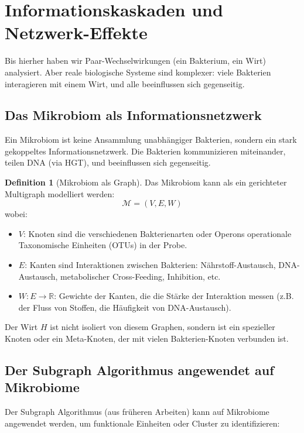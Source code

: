 \documentclass[a4paper,12pt]{article}
\theoremstyle{definition}
\newtheorem{definition}{Definition}
\begin{document}
\section{Informationskaskaden und Netzwerk-Effekte}


Bis hierher haben wir Paar-Wechselwirkungen (ein Bakterium, ein Wirt) analysiert. Aber reale biologische Systeme sind komplexer: viele Bakterien interagieren mit einem Wirt, und alle beeinflussen sich gegenseitig.

\subsection{Das Mikrobiom als Informationsnetzwerk}

Ein Mikrobiom ist keine Ansammlung unabhängiger Bakterien, sondern ein stark gekoppeltes Informationsnetzwerk. Die Bakterien kommunizieren miteinander, teilen DNA (via HGT), und beeinflussen sich gegenseitig.

\begin{definition}[Mikrobiom als Graph]
Das Mikrobiom kann als ein gerichteter Multigraph modelliert werden:
\[
\mathcal{M} = (V, E, W)
\]
wobei:
\begin{itemize}
    \item[-] $V$: Knoten sind die verschiedenen Bakterienarten oder Operons operationale Taxonomische Einheiten (OTUs) in der Probe.
    \item[-] $E$: Kanten sind Interaktionen zwischen Bakterien: Nährstoff-Austausch, DNA-Austausch, metabolischer Cross-Feeding, Inhibition, etc.
    \item[-] $W: E \to \mathbb{R}$: Gewichte der Kanten, die die Stärke der Interaktion messen (z.B. der Fluss von Stoffen, die Häufigkeit von DNA-Austausch).
\end{itemize}

Der Wirt $H$ ist nicht isoliert von diesem Graphen, sondern ist ein spezieller Knoten oder ein Meta-Knoten, der mit vielen Bakterien-Knoten verbunden ist.
\end{definition}

\subsection{Der Subgraph Algorithmus angewendet auf Mikrobiome}

Der Subgraph Algorithmus (aus früheren Arbeiten) kann auf Mikrobiome angewendet werden, um funktionale Einheiten oder Cluster zu identifizieren:
\end{document}
